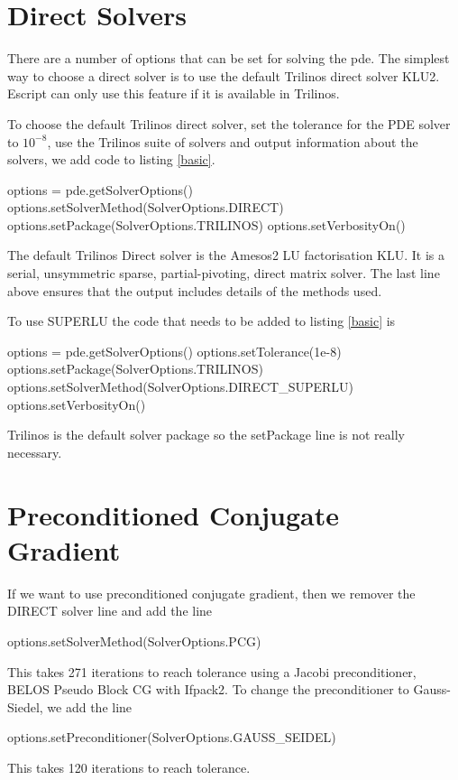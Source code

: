 \section{Direct Solvers}
There are a number of options that can be set for solving the pde.  The simplest way to choose a direct solver is to use the default Trilinos direct solver KLU2.  Escript can only use this feature if it is available in Trilinos.

To choose the default Trilinos direct solver, set the tolerance for the PDE solver to $10^{-8}$,  use the Trilinos suite of solvers and output information about the solvers, we add code to listing \ref{basic}.
\begin{python}[caption=default Direct , label=defaultdirect ]
options = pde.getSolverOptions()  
options.setSolverMethod(SolverOptions.DIRECT)         
options.setPackage(SolverOptions.TRILINOS)
options.setVerbosityOn()        
\end{python}
The default Trilinos Direct solver is the Amesos2 LU factorisation KLU. It is a serial, unsymmetric sparse, partial-pivoting, direct matrix solver.  The last line above ensures that the output includes details of the methods used.


To use SUPERLU the code that needs to be added to listing \ref{basic} is 
\begin{python}[caption=SuperLU, label=superLU ]
options = pde.getSolverOptions()  
options.setTolerance(1e-8)        
options.setPackage(SolverOptions.TRILINOS)
options.setSolverMethod(SolverOptions.DIRECT_SUPERLU)
options.setVerbosityOn()        
\end{python}
Trilinos is the default solver package so the setPackage line is not really necessary.

\section{Preconditioned Conjugate Gradient}
If we want to use preconditioned conjugate gradient, then we remover the DIRECT solver line and add the line
\begin{python}[caption=Preconditioned conjugate gradient defaults, label=PCG]
options.setSolverMethod(SolverOptions.PCG)        
\end{python}
This takes 271 iterations to reach tolerance using a Jacobi preconditioner, BELOS Pseudo Block CG with Ifpack2.  To change the preconditioner to Gauss-Siedel, we add the line
\begin{python}
options.setPreconditioner(SolverOptions.GAUSS_SEIDEL)
\end{python}
This takes 120 iterations to reach tolerance.



